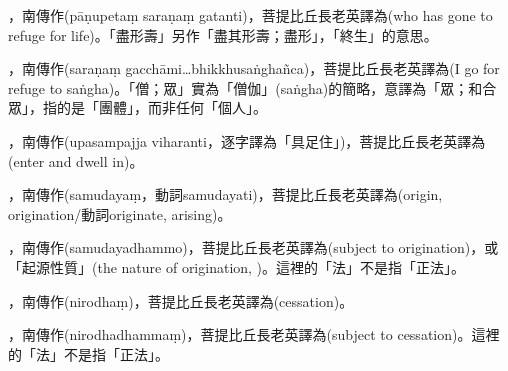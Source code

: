 \startitemgroup[noteitems]
\item{}，南傳作(pāṇupetaṃ saraṇaṃ gatanti)，菩提比丘長老英譯為(who has gone to refuge for life)。「盡形壽」另作「盡其形壽；盡形」，「終生」的意思。
\stopitemgroup

\startitemgroup[noteitems]
\item{}，南傳作(saraṇaṃ gacchāmi…bhikkhusaṅghañca)，菩提比丘長老英譯為(I go for refuge to saṅgha)。「僧；眾」實為「僧伽」(saṅgha)的簡略，意譯為「眾；和合眾」，指的是「團體」，而非任何「個人」。
\stopitemgroup

\startitemgroup[noteitems]
\item{}，南傳作(upasampajja viharanti，逐字譯為「具足住」)，菩提比丘長老英譯為(enter and dwell in)。
\stopitemgroup

\startitemgroup[noteitems]
\item{}，南傳作(samudayaṃ，動詞samudayati)，菩提比丘長老英譯為(origin, origination/動詞originate, arising)。
\item{}，南傳作(samudayadhammo)，菩提比丘長老英譯為(subject to origination)，或「起源性質」(the nature of origination, )。這裡的「法」不是指「正法」。
\stopitemgroup

\startitemgroup[noteitems]
\item{}，南傳作(nirodhaṃ)，菩提比丘長老英譯為(cessation)。
\item{}，南傳作(nirodhadhammaṃ)，菩提比丘長老英譯為(subject to cessation)。這裡的「法」不是指「正法」。
\stopitemgroup

